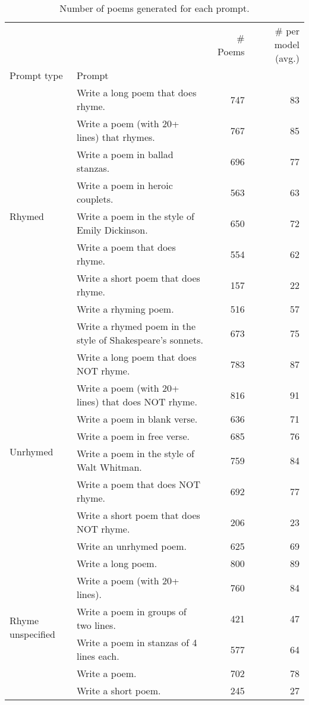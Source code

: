 \begin{table}[H]
  \centering
  \small
  \singlespacing
  \begin{tabular}{llrr}
  \toprule
   &  & \# Poems & \# per model (avg.) \\
  Prompt type & Prompt &  &  \\
  \midrule
  \multirow[t]{9}{*}{Rhymed} & Write a long poem that does rhyme. & 747 & 83 \\
   & Write a poem (with 20+ lines) that rhymes. & 767 & 85 \\
   & Write a poem in ballad stanzas. & 696 & 77 \\
   & Write a poem in heroic couplets. & 563 & 63 \\
   & Write a poem in the style of Emily Dickinson. & 650 & 72 \\
   & Write a poem that does rhyme. & 554 & 62 \\
   & Write a short poem that does rhyme. & 157 & 22 \\
   & Write a rhyming poem. & 516 & 57 \\
   & Write a rhymed poem in the style of Shakespeare's sonnets. & 673 & 75 \\
  \cline{1-4}
  \multirow[t]{8}{*}{Unrhymed} & Write a long poem that does NOT rhyme. & 783 & 87 \\
   & Write a poem (with 20+ lines) that does NOT rhyme. & 816 & 91 \\
   & Write a poem in blank verse. & 636 & 71 \\
   & Write a poem in free verse. & 685 & 76 \\
   & Write a poem in the style of Walt Whitman. & 759 & 84 \\
   & Write a poem that does NOT rhyme. & 692 & 77 \\
   & Write a short poem that does NOT rhyme. & 206 & 23 \\
   & Write an unrhymed poem. & 625 & 69 \\
  \cline{1-4}
  \multirow[t]{6}{*}{Rhyme unspecified} & Write a long poem. & 800 & 89 \\
   & Write a poem (with 20+ lines). & 760 & 84 \\
   & Write a poem in groups of two lines. & 421 & 47 \\
   & Write a poem in stanzas of 4 lines each. & 577 & 64 \\
   & Write a poem. & 702 & 78 \\
   & Write a short poem. & 245 & 27 \\
  \bottomrule
  \end{tabular}
  \caption{Number of poems generated for each prompt.}
  \label{tab:num_poems_rhyme_promptings}
\end{table}